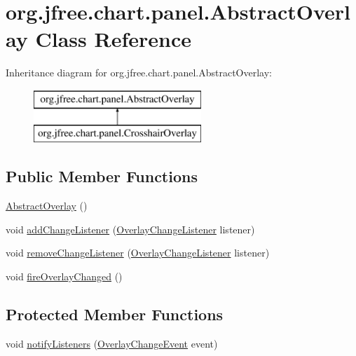\hypertarget{classorg_1_1jfree_1_1chart_1_1panel_1_1_abstract_overlay}{}\section{org.\+jfree.\+chart.\+panel.\+Abstract\+Overlay Class Reference}
\label{classorg_1_1jfree_1_1chart_1_1panel_1_1_abstract_overlay}
Inheritance diagram for org.\+jfree.\+chart.\+panel.\+Abstract\+Overlay\+:\begin{figure}[H]
\begin{center}
\leavevmode
\includegraphics[height=2.000000cm]{classorg_1_1jfree_1_1chart_1_1panel_1_1_abstract_overlay}
\end{center}
\end{figure}
\subsection*{Public Member Functions}
\begin{DoxyCompactItemize}
\item 
\mbox{\hyperlink{classorg_1_1jfree_1_1chart_1_1panel_1_1_abstract_overlay_a9de5e83bac9db3f3e41e6df10da53153}{Abstract\+Overlay}} ()
\item 
void \mbox{\hyperlink{classorg_1_1jfree_1_1chart_1_1panel_1_1_abstract_overlay_a987e3cccb62e8de2948b2228c6506b65}{add\+Change\+Listener}} (\mbox{\hyperlink{interfaceorg_1_1jfree_1_1chart_1_1event_1_1_overlay_change_listener}{Overlay\+Change\+Listener}} listener)
\item 
void \mbox{\hyperlink{classorg_1_1jfree_1_1chart_1_1panel_1_1_abstract_overlay_a0b069ed367855570b9ac89ff324a881a}{remove\+Change\+Listener}} (\mbox{\hyperlink{interfaceorg_1_1jfree_1_1chart_1_1event_1_1_overlay_change_listener}{Overlay\+Change\+Listener}} listener)
\item 
void \mbox{\hyperlink{classorg_1_1jfree_1_1chart_1_1panel_1_1_abstract_overlay_acfdb838b5dc44a788fdbddfbfb86e36d}{fire\+Overlay\+Changed}} ()
\end{DoxyCompactItemize}
\subsection*{Protected Member Functions}
\begin{DoxyCompactItemize}
\item 
void \mbox{\hyperlink{classorg_1_1jfree_1_1chart_1_1panel_1_1_abstract_overlay_ad44849c30d75a72d225912cc8e03bc00}{notify\+Listeners}} (\mbox{\hyperlink{classorg_1_1jfree_1_1chart_1_1event_1_1_overlay_change_event}{Overlay\+Change\+Event}} event)
\end{DoxyCompactItemize}



